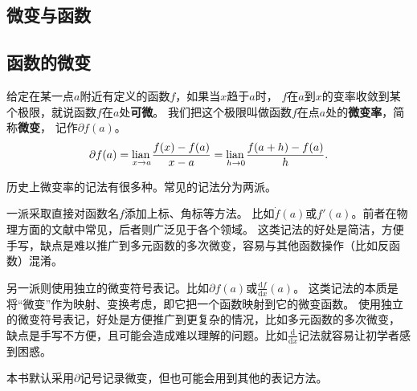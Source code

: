 \documentclass[12pt,UTF8,fontset=none]{ctexbook}
\begin{document}
\begin{appendix}




\chapter{微变与函数}

\section{函数的微变}

\begin{df}\label{df:b-1-0}
给定在某一点$a$附近有定义的函数$f$，如果当$x$趋于$a$时，
$f$在$a$到$x$的变率收敛到某个极限，就说函数$f$在$a$处\textbf{可微}。
我们把这个极限叫做函数$f$在点$a$处的\textbf{微变率}，简称\textbf{微变}，
记作$\partial f(a)$。
$$ \partial f(a) = \underset{x\to a}{\operatorname{lian}\,} \frac{f(x) - f(a)}{x - a} = \underset{h\to 0}{\operatorname{lian}\,} \frac{f(a + h) - f(a)}{h}.$$

历史上微变率的记法有很多种。常见的记法分为两派。

一派采取直接对函数名$f$添加上标、角标等方法。
比如$\dot{f}(a)$或$f'(a)$。前者在物理方面的文献中常见，后者则广泛见于各个领域。
这类记法的好处是简洁，方便手写，缺点是难以推广到多元函数的多次微变，容易与其他函数操作（比如反函数）混淆。

另一派则使用独立的微变符号表记。比如$\partial f(a)$或$\frac{\mathrm{d}f}{\mathrm{d}x}(a)$。
这类记法的本质是将“微变”作为映射、变换考虑，即它把一个函数映射到它的微变函数。
使用独立的微变符号表记，好处是方便推广到更复杂的情况，比如多元函数的多次微变，
缺点是手写不方便，且可能会造成难以理解的问题。比如$\frac{\mathrm{d}}{\mathrm{d}x}$记法就容易让初学者感到困惑。

本书默认采用$\partial$记号记录微变，但也可能会用到其他的表记方法。
\end{df}


\end{appendix}
\end{document}
